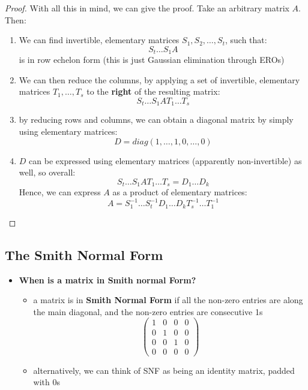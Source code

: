 \documentclass{exam}
\begin{document}
\begin{proof}
With all this in mind, we can give the proof. Take an arbitrary matrix $A$. Then:
\begin{enumerate}
    \item We can find invertible, elementary matrices $S_1, S_2, \ldots, S_t$, such that:
    \[
    S_t\ldots S_1 A
    \]
    is in row echelon form (this is just Gaussian elimination through EROs)
    \item We can then reduce the columns, by applying a set of invertible, elementary matrices $T_1, \ldots, T_s$ to the \textbf{right} of the resulting matrix:
    \[
    S_t\ldots S_1 AT_1\ldots T_s
    \]
    \item by reducing rows and columns, we can obtain a diagonal matrix by simply using elementary matrices:
    \[
    D = diag(1,\ldots,1,0,\ldots,0)
    \]
    \item $D$ can be expressed using elementary matrices (apparently non-invertible) as well, so overall:
    \[
    S_t\ldots S_1 AT_1\ldots T_s = D_1\ldots D_k
    \]
    Hence, we can express $A$ as a product of elementary matrices:
    \[
    A = S_1^{-1}\ldots S_t^{-1}D_1\ldots D_kT_{s}^{-1}\ldots T_{1}^{-1}
    \]
    
\end{enumerate}

\end{proof}

\subsection{The Smith Normal Form}

\begin{itemize}
    \item \textbf{When is a matrix in Smith normal Form?}
    \begin{itemize}
        \item a matrix is in \textbf{Smith Normal Form} if all the non-zero entries are along the main diagonal, and the non-zero entries are consecutive 1s
        \[
        \begin{pmatrix}
        1 & 0 & 0 & 0 \\
        0 & 1 & 0 & 0 \\
        0 & 0 & 1 & 0 \\
        0 & 0 & 0 & 0
        \end{pmatrix}
        \]
        \item alternatively, we can think of SNF as being an identity matrix, padded with 0s
    \end{itemize}
\end{itemize}
\end{document}
